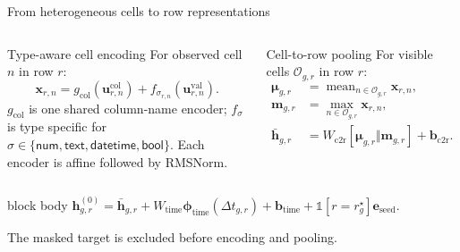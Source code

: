 \documentclass[aspectratio=169,10pt,t]{beamer}
\begin{document}
\begin{frame}{From heterogeneous cells to row representations}
  \begin{columns}[T,onlytextwidth]
      \vspace{0pt}
      \begin{block}{Type-aware cell encoding}
        For observed cell $n$ in row $r$:
        \[
          \mathbf x_{r,n}
          =g_{\mathrm{col}}(\mathbf u_{r,n}^{\mathrm{col}})
          +f_{\sigma_{r,n}}(\mathbf u_{r,n}^{\mathrm{val}}).
        \]
        $g_{\mathrm{col}}$ is one shared column-name encoder;
        $f_{\sigma}$ is type specific for
        $\sigma\in\{\mathsf{num},\mathsf{text},\mathsf{datetime},\mathsf{bool}\}$.
        Each encoder is affine followed by RMSNorm.
      \end{block}

      \vspace{0pt}
      \begin{exampleblock}{Cell-to-row pooling}
        For visible cells $\mathcal O_{g,r}$ in row $r$:
        \[
        \begin{aligned}
          \bm\mu_{g,r} &= \operatorname{mean}_{n\in\mathcal O_{g,r}}\mathbf x_{r,n},\\
          \mathbf m_{g,r} &= \operatorname{max}_{n\in\mathcal O_{g,r}}\mathbf x_{r,n},\\
          \bar{\mathbf h}_{g,r} &= W_{\mathrm{c2r}}[\bm\mu_{g,r}\Vert\mathbf m_{g,r}]+\mathbf b_{\mathrm{c2r}}.
        \end{aligned}
        \]
      \end{exampleblock}
  \end{columns}

  \vspace{.18cm}
  \begin{beamercolorbox}[sep=.55em,wd=\linewidth]{block body}
    \centering\small
    $\mathbf h_{g,r}^{(0)}=\bar{\mathbf h}_{g,r}
    +W_{\mathrm{time}}\bm\phi_{\mathrm{time}}(\Delta t_{g,r})+\mathbf b_{\mathrm{time}}
    +\mathbb{1}[r=r_g^\star]\mathbf e_{\mathrm{seed}}$.
    
    The masked target is excluded before encoding and pooling.
  \end{beamercolorbox}
\end{frame}
\end{document}
